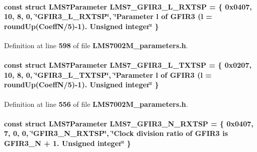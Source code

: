\paragraph[{L\+M\+S7\+\_\+\+G\+F\+I\+R3\+\_\+\+L\+\_\+\+R\+X\+T\+SP}]{\setlength{\rightskip}{0pt plus 5cm}const struct {\bf L\+M\+S7\+Parameter} L\+M\+S7\+\_\+\+G\+F\+I\+R3\+\_\+\+L\+\_\+\+R\+X\+T\+SP = \{ 0x0407, 10, 8, 0, \char`\"{}\+G\+F\+I\+R3\+\_\+\+L\+\_\+\+R\+X\+T\+S\+P\char`\"{}, \char`\"{}\+Parameter l of G\+F\+I\+R3 (l = round\+Up(\+Coeff\+N/5)-\/1). Unsigned integer\char`\"{} \}\hspace{0.3cm}{\ttfamily [static]}}\label{LMS7002M__parameters_8h_a295543214ed8f3d1851f5ce32732826a}


Definition at line {\bf 598} of file {\bf L\+M\+S7002\+M\+\_\+parameters.\+h}.

\paragraph[{L\+M\+S7\+\_\+\+G\+F\+I\+R3\+\_\+\+L\+\_\+\+T\+X\+T\+SP}]{\setlength{\rightskip}{0pt plus 5cm}const struct {\bf L\+M\+S7\+Parameter} L\+M\+S7\+\_\+\+G\+F\+I\+R3\+\_\+\+L\+\_\+\+T\+X\+T\+SP = \{ 0x0207, 10, 8, 0, \char`\"{}\+G\+F\+I\+R3\+\_\+\+L\+\_\+\+T\+X\+T\+S\+P\char`\"{}, \char`\"{}\+Parameter l of G\+F\+I\+R3 (l = round\+Up(\+Coeff\+N/5)-\/1). Unsigned integer\char`\"{} \}\hspace{0.3cm}{\ttfamily [static]}}\label{LMS7002M__parameters_8h_a50c0360e91d0f25bba9e4965232fd2f4}


Definition at line {\bf 556} of file {\bf L\+M\+S7002\+M\+\_\+parameters.\+h}.

\paragraph[{L\+M\+S7\+\_\+\+G\+F\+I\+R3\+\_\+\+N\+\_\+\+R\+X\+T\+SP}]{\setlength{\rightskip}{0pt plus 5cm}const struct {\bf L\+M\+S7\+Parameter} L\+M\+S7\+\_\+\+G\+F\+I\+R3\+\_\+\+N\+\_\+\+R\+X\+T\+SP = \{ 0x0407, 7, 0, 0, \char`\"{}\+G\+F\+I\+R3\+\_\+\+N\+\_\+\+R\+X\+T\+S\+P\char`\"{}, \char`\"{}\+Clock division ratio of G\+F\+I\+R3 is G\+F\+I\+R3\+\_\+\+N + 1. Unsigned integer\char`\"{} \}\hspace{0.3cm}{\ttfamily [static]}}\label{LMS7002M__parameters_8h_a752343f8badb37f2e21b4f8637071d7f}


